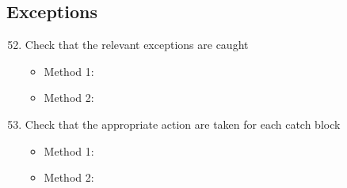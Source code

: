 \subsection{Exceptions}
\begin{enumerate}
	\setcounter{enumi}{51}
	\item Check that the relevant exceptions are caught
	\begin{itemize}
		\item Method 1: \cmark
		\item Method 2: \cmark
	\end{itemize}
	\item Check that the appropriate action are taken for each catch block
	\begin{itemize}
		\item Method 1: \cmark
		\item Method 2: \cmark
	\end{itemize}
\end{enumerate}